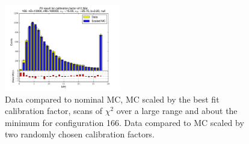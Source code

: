 \begin{figure}[htbp]
\begin{center}
\includegraphics[width=0.45\textwidth]{../FIGURES/166/FIG_Fit_result_for_calibration_factor_of_0_564.pdf} 
\caption{Data compared to nominal MC, MC scaled by the best fit calibration factor, scans of $\chi^2$ over a large range and about the minimum for configuration 166. Data compared to MC scaled by two randomly chosen calibration factors.} 
\label{tab:best_166} 
\end{center} \end{figure} 

